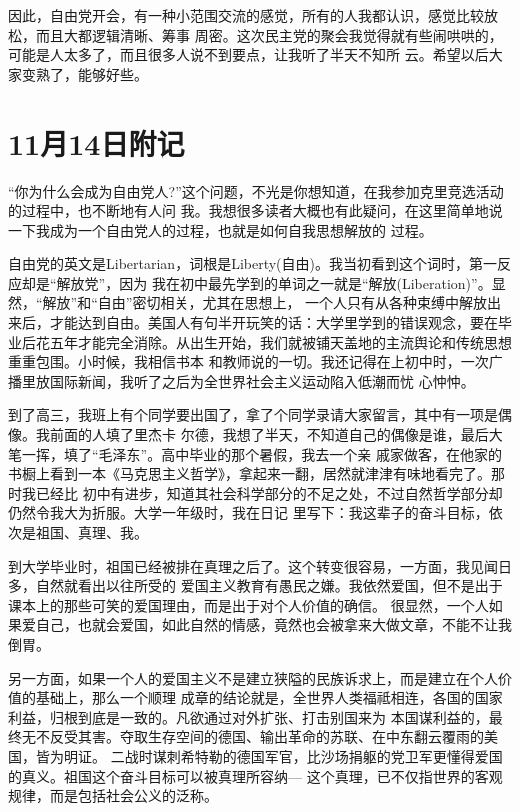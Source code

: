 ﻿\documentclass[11pt]{article}
\begin{document}
因此，自由党开会，有一种小范围交流的感觉，所有的人我都认识，感觉比较放松，而且大都逻辑清晰、筹事
周密。这次民主党的聚会我觉得就有些闹哄哄的，可能是人太多了，而且很多人说不到要点，让我听了半天不知所
云。希望以后大家变熟了，能够好些。

\section{11月14日附记}

``你为什么会成为自由党人?''这个问题，不光是你想知道，在我参加克里竞选活动的过程中，也不断地有人问
我。我想很多读者大概也有此疑问，在这里简单地说一下我成为一个自由党人的过程，也就是如何自我思想解放的
过程。

自由党的英文是Libertarian，词根是Liberty(自由)。我当初看到这个词时，第一反应却是``解放党''，因为
我在初中最先学到的单词之一就是``解放(Liberation)''。显然，``解放''和``自由''密切相关，尤其在思想上，
一个人只有从各种束缚中解放出来后，才能达到自由。美国人有句半开玩笑的话：大学里学到的错误观念，要在毕
业后花五年才能完全消除。从出生开始，我们就被铺天盖地的主流舆论和传统思想重重包围。小时候，我相信书本
和教师说的一切。我还记得在上初中时，一次广播里放国际新闻，我听了之后为全世界社会主义运动陷入低潮而忧
心忡忡。

到了高三，我班上有个同学要出国了，拿了个同学录请大家留言，其中有一项是偶像。我前面的人填了里杰卡
尔德，我想了半天，不知道自己的偶像是谁，最后大笔一挥，填了``毛泽东''。高中毕业的那个暑假，我去一个亲
戚家做客，在他家的书橱上看到一本《马克思主义哲学》，拿起来一翻，居然就津津有味地看完了。那时我已经比
初中有进步，知道其社会科学部分的不足之处，不过自然哲学部分却仍然令我大为折服。大学一年级时，我在日记
里写下：我这辈子的奋斗目标，依次是祖国、真理、我。

到大学毕业时，祖国已经被排在真理之后了。这个转变很容易，一方面，我见闻日多，自然就看出以往所受的
爱国主义教育有愚民之嫌。我依然爱国，但不是出于课本上的那些可笑的爱国理由，而是出于对个人价值的确信。
很显然，一个人如果爱自己，也就会爱国，如此自然的情感，竟然也会被拿来大做文章，不能不让我倒胃。

另一方面，如果一个人的爱国主义不是建立狭隘的民族诉求上，而是建立在个人价值的基础上，那么一个顺理
成章的结论就是，全世界人类福祗相连，各国的国家利益，归根到底是一致的。凡欲通过对外扩张、打击别国来为
本国谋利益的，最终无不反受其害。夺取生存空间的德国、输出革命的苏联、在中东翻云覆雨的美国，皆为明证。
二战时谋刺希特勒的德国军官，比沙场捐躯的党卫军更懂得爱国的真义。祖国这个奋斗目标可以被真理所容纳---
这个真理，已不仅指世界的客观规律，而是包括社会公义的泛称。
\end{document}
